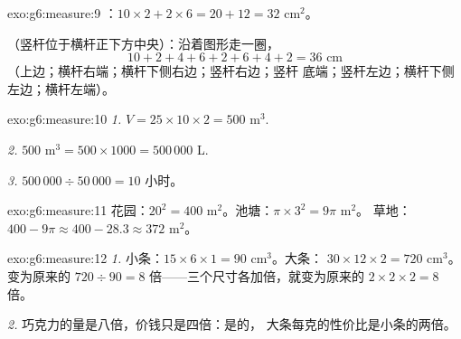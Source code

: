\begin{solution}{exo:g6:measure:9}
：$10 \times 2 + 2 \times 6 = 20 + 12 = 32$ cm$^2$。

（竖杆位于横杆正下方中央）：沿着图形走一圈，
\[
10 + 2 + 4 + 6 + 2 + 6 + 4 + 2 = 36 \text{ cm}
\]
（上边；横杆右端；横杆下侧右边；竖杆右边；竖杆
底端；竖杆左边；横杆下侧左边；横杆左端）。
\end{solution}

\begin{solution}{exo:g6:measure:10}
\emph{1.} $V = 25 \times 10 \times 2 = 500$ m$^3$.

\emph{2.} $500$ m$^3 = 500 \times 1000 = 500\,000$ L.

\emph{3.} $500\,000 \div 50\,000 = 10$ 小时。
\end{solution}

\begin{solution}{exo:g6:measure:11}
花园：$20^2 = 400$ m$^2$。池塘：$\pi \times 3^2 = 9\pi$ m$^2$。
草地：$400 - 9\pi \approx 400 - 28.3 \approx 372$ m$^2$。
\end{solution}

\begin{solution}{exo:g6:measure:12}
\emph{1.} 小条：$15 \times 6 \times 1 = 90$ cm$^3$。大条：
$30 \times 12 \times 2 = 720$ cm$^3$。变为原来的
$720 \div 90 = 8$ 倍——三个尺寸各加倍，就变为原来的
$2 \times 2 \times 2 = 8$ 倍。

\emph{2.} 巧克力的量是八倍，价钱只是四倍：是的，
大条每克的性价比是小条的两倍。
\end{solution}

